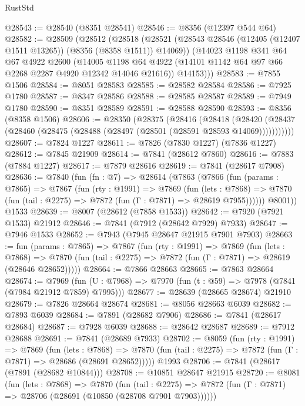 \begin{lexlean}{RustStd}
\begin{coremodule}
@28543 := @28540 (@8351 @28541)
@28546 := @8356 (@12397 @544 @64)
@28582 := @28509
    (@28512
      (@28518
        (@28521 (@28543 @28546 (@12405 (@12407 @1511 @13265)) (@8356 (@8358 @1511)) @14069))
        (@14023
          @1198
          @341
          @64
          @67
          @4922
          @2600
          (@14005 @1198 @64 @4922 (@14101 @1142 @64 @97 @66 @2268 @2287 @4920 @12342 @14046 @21616))
          @14153)))
@28583 := @7855 @1506
@28584 := @8051 @28583
@28585 := @28582 @28584
@28586 := @7925 @1780
@28587 := @8347 @28586
@28588 := @28585 @28587
@28589 := @7949 @1780
@28590 := @8351 @28589
@28591 := @28588 @28590
@28593 := @8356 (@8358 @1506)
@28606 := @28350
    (@28375
      (@28416
        (@28418
          (@28420 (@28437 (@28460 (@28475 (@28488 (@28497 (@28501 (@28591 @28593 @14069)))))))))))
@28607 := @7824 @1227
@28611 := @7826 (@7830 @1227) (@7836 @1227)
@28612 := @7845 @21909
@28614 := @7841 (@28612 @7860)
@28616 := @7883 (@7884 @1227)
@28617 := @7879 @28616
@28619 := @7841 (@28617 @7908)
@28636 := @7840
    (fun (fn : @7) =>
    @28614
      (@7863
        (@7866
          (fun (params : @7865) =>
          @7867
            (fun (rty : @1991) =>
            @7869
              (fun (lets : @7868) =>
              @7870 (fun (tail : @2275) => @7872 (fun (Γ : @7871) => @28619 @7955))))))
        @8001))
    @1533
@28639 := @8007 (@28612 (@7858 @1533))
@28642 := @7920 (@7921 @1533) @21912
@28646 := @7841 (@7912 (@28642 @7929) @7933)
@28647 := @7946 @1533
@28652 := @7943 (@7945 @28647 @21915 @7901 @7903)
@28663 := fun (params : @7865) =>
  @7867
    (fun (rty : @1991) =>
    @7869
      (fun (lets : @7868) =>
      @7870 (fun (tail : @2275) => @7872 (fun (Γ : @7871) => @28619 (@28646 @28652)))))
@28664 := @7866 @28663
@28665 := @7863 @28664
@28674 := @7969
    (fun (U : @7968) => @7970 (fun (t : @59) => @7978 (@7841 (@7984 @21912 @7859) @7995)))
@28677 := @28639 (@28665 @28674) @21910
@28679 := @7826 @28664 @28674
@28681 := @8056 @28663 @6039
@28682 := @7893 @6039
@28684 := @7891 (@28682 @7906)
@28686 := @7841 (@28617 @28684)
@28687 := @7928 @6039
@28688 := @28642 @28687
@28689 := @7912 @28688
@28691 := @7841 (@28689 @7933)
@28702 := @8059
    (fun (rty : @1991) =>
    @7869
      (fun (lets : @7868) =>
      @7870 (fun (tail : @2275) => @7872 (fun (Γ : @7871) => @28686 (@28691 @28652)))))
    @1993
@28706 := @7841 (@28617 (@7891 (@28682 @10844)))
@28708 := @10851 @28647 @21915
@28720 := @8081
    (fun (lets : @7868) =>
    @7870
      (fun (tail : @2275) =>
      @7872 (fun (Γ : @7871) => @28706 (@28691 (@10850 (@28708 @7901 @7903))))))

\end{coremodule}
\end{lexlean}
